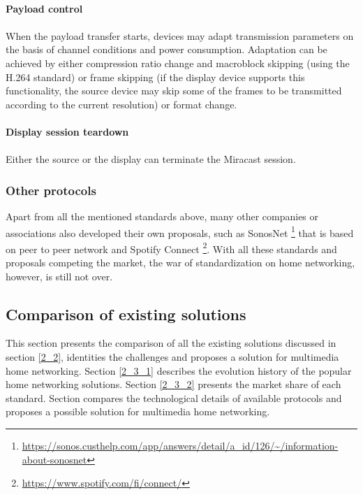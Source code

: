 \\
\textbf{Payload control}\\
\\
When the payload transfer starts, devices may adapt transmission parameters on
the basis of channel conditions and power consumption. Adaptation can be achieved by either compression ratio change and macroblock skipping (using the H.264 standard) or frame skipping (if the display device supports this functionality, the source device may skip some of the frames to be transmitted according to the current resolution) or format change. \\
\\ 
\textbf{Display session teardown} \\
\\
Either the source or the display can terminate the Miracast session.
\subsubsection{Other protocols\label{2_2_6}}
Apart from all the mentioned standards above, many other companies or associations 
also developed their own proposals, such as SonosNet \cite{sonosnet}
\footnote{\url{https://sonos.custhelp.com/app/answers/detail/a_id/126/~/information-about-sonosnet}}
that is based on peer to peer network and Spotify Connect \cite{spotifyconnect}
\footnote{\url{https://www.spotify.com/fi/connect/}}. With all these standards
and proposals competing the market, the war of standardization on home networking, however, is still not over.

\subsection{Comparison of existing solutions\label{2_3}} 
This section presents the comparison of all the existing solutions discussed in section \ref{2_2}, identities the challenges and proposes a solution for multimedia home networking. Section \ref{2_3_1} describes the evolution history of the popular home networking solutions. Section \ref{2_3_2} presents the market share of each standard. Section compares the technological details of available protocols and proposes a possible solution for multimedia home networking.
